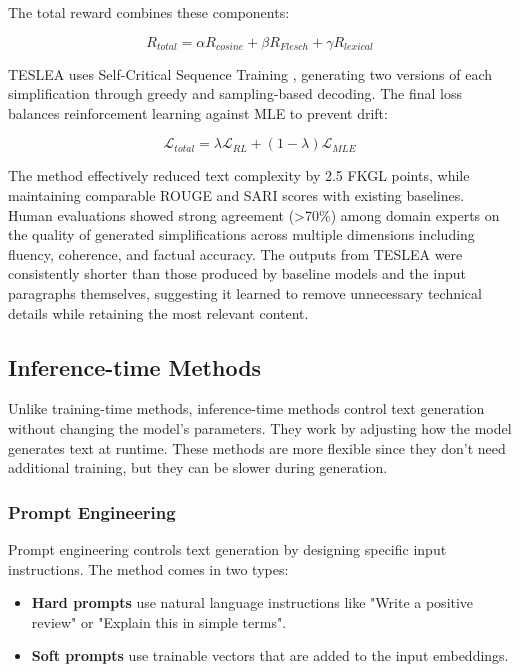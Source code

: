 The total reward combines these components:

\begin{equation}
    R_{total} = \alpha R_{cosine} + \beta R_{Flesch} + \gamma R_{lexical}
\end{equation}

TESLEA uses Self-Critical Sequence Training \cite{8099614}, generating two versions of each simplification through greedy and sampling-based decoding. The final loss balances reinforcement learning against MLE to prevent drift:

\begin{equation}
    \mathcal{L}_{total} = \lambda \mathcal{L}_{RL} + (1-\lambda)\mathcal{L}_{MLE}
\end{equation}

The method effectively reduced text complexity by 2.5 FKGL points, while maintaining comparable ROUGE and SARI scores with existing baselines. 
Human evaluations showed strong agreement (>70\%) among domain experts on the quality of generated simplifications across multiple dimensions including fluency, coherence, and factual accuracy.
The outputs from TESLEA were consistently shorter than those produced by baseline models and the input paragraphs themselves, suggesting it learned to remove unnecessary technical details while retaining the most relevant content.

\subsection{Inference-time Methods}

Unlike training-time methods, inference-time methods control text generation without changing the model's parameters. They work by adjusting how the model generates text at runtime. These methods are more flexible since they don't need additional training, but they can be slower during generation.

\subsubsection{Prompt Engineering}

Prompt engineering controls text generation by designing specific input instructions. The method comes in two types:

\begin{itemize}
    \item \textbf{Hard prompts} use natural language instructions like "Write a positive review" or "Explain this in simple terms".
    \item \textbf{Soft prompts} use trainable vectors that are added to the input embeddings.
\end{itemize}

